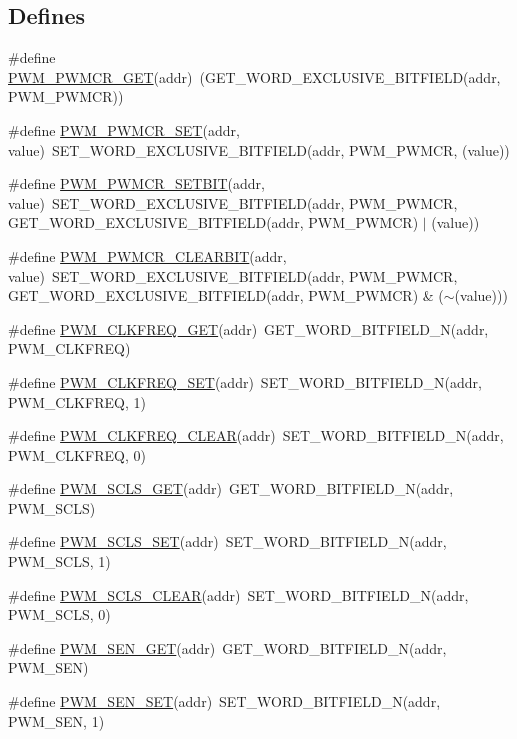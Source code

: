 \subsection*{Defines}
\begin{DoxyCompactItemize}
\item 
\#define \hyperlink{a00564_a9ca96287c76d806aaf80ecd8bdea2780}{PWM\_\-PWMCR\_\-GET}(addr)~(GET\_\-WORD\_\-EXCLUSIVE\_\-BITFIELD(addr, PWM\_\-PWMCR))
\item 
\#define \hyperlink{a00564_a63b6ca52bb8683da75423d6cbc5e6dad}{PWM\_\-PWMCR\_\-SET}(addr, value)~SET\_\-WORD\_\-EXCLUSIVE\_\-BITFIELD(addr, PWM\_\-PWMCR, (value))
\item 
\#define \hyperlink{a00564_aa27a948fb01f49edcb55fa4d1733d666}{PWM\_\-PWMCR\_\-SETBIT}(addr, value)~SET\_\-WORD\_\-EXCLUSIVE\_\-BITFIELD(addr, PWM\_\-PWMCR, GET\_\-WORD\_\-EXCLUSIVE\_\-BITFIELD(addr, PWM\_\-PWMCR) $|$ (value))
\item 
\#define \hyperlink{a00564_a9f0d1b9df47048caa7fa5c06d25bbe35}{PWM\_\-PWMCR\_\-CLEARBIT}(addr, value)~SET\_\-WORD\_\-EXCLUSIVE\_\-BITFIELD(addr, PWM\_\-PWMCR, GET\_\-WORD\_\-EXCLUSIVE\_\-BITFIELD(addr, PWM\_\-PWMCR) \& ($\sim$(value)))
\item 
\#define \hyperlink{a00564_a2423061150fcccea7c39c1f8f9a04c21}{PWM\_\-CLKFREQ\_\-GET}(addr)~GET\_\-WORD\_\-BITFIELD\_\-N(addr, PWM\_\-CLKFREQ)
\item 
\#define \hyperlink{a00564_a6c27b15f0bb5e6d1feb3db63d74b4b73}{PWM\_\-CLKFREQ\_\-SET}(addr)~SET\_\-WORD\_\-BITFIELD\_\-N(addr, PWM\_\-CLKFREQ, 1)
\item 
\#define \hyperlink{a00564_a400b9772036d907dda9504b67b108f4f}{PWM\_\-CLKFREQ\_\-CLEAR}(addr)~SET\_\-WORD\_\-BITFIELD\_\-N(addr, PWM\_\-CLKFREQ, 0)
\item 
\#define \hyperlink{a00564_a9a8550a68459aa9bf9ef3fc92a560c97}{PWM\_\-SCLS\_\-GET}(addr)~GET\_\-WORD\_\-BITFIELD\_\-N(addr, PWM\_\-SCLS)
\item 
\#define \hyperlink{a00564_a9fde8ec4775161b94d3fce67ba36d6fe}{PWM\_\-SCLS\_\-SET}(addr)~SET\_\-WORD\_\-BITFIELD\_\-N(addr, PWM\_\-SCLS, 1)
\item 
\#define \hyperlink{a00564_a88a12d6dcc36bc6f1089228999192fd0}{PWM\_\-SCLS\_\-CLEAR}(addr)~SET\_\-WORD\_\-BITFIELD\_\-N(addr, PWM\_\-SCLS, 0)
\item 
\#define \hyperlink{a00564_a18b3d60afb481bf5b9e3a1125e2a31ca}{PWM\_\-SEN\_\-GET}(addr)~GET\_\-WORD\_\-BITFIELD\_\-N(addr, PWM\_\-SEN)
\item 
\#define \hyperlink{a00564_a9242f83ae01ab324f99b87b0f94a2ff3}{PWM\_\-SEN\_\-SET}(addr)~SET\_\-WORD\_\-BITFIELD\_\-N(addr, PWM\_\-SEN, 1)

\end{DoxyCompactItemize}
